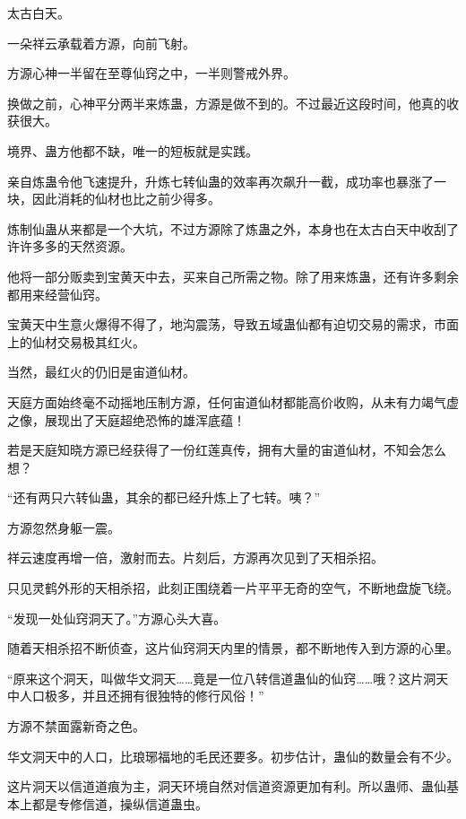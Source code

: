 
\begin{this_body}



太古白天。

一朵祥云承载着方源，向前飞射。

方源心神一半留在至尊仙窍之中，一半则警戒外界。

换做之前，心神平分两半来炼蛊，方源是做不到的。不过最近这段时间，他真的收获很大。

境界、蛊方他都不缺，唯一的短板就是实践。

亲自炼蛊令他飞速提升，升炼七转仙蛊的效率再次飙升一截，成功率也暴涨了一块，因此消耗的仙材也比之前少得多。

炼制仙蛊从来都是一个大坑，不过方源除了炼蛊之外，本身也在太古白天中收刮了许许多多的天然资源。

他将一部分贩卖到宝黄天中去，买来自己所需之物。除了用来炼蛊，还有许多剩余都用来经营仙窍。

宝黄天中生意火爆得不得了，地沟震荡，导致五域蛊仙都有迫切交易的需求，市面上的仙材交易极其红火。

当然，最红火的仍旧是宙道仙材。

天庭方面始终毫不动摇地压制方源，任何宙道仙材都能高价收购，从未有力竭气虚之像，展现出了天庭超绝恐怖的雄浑底蕴！

若是天庭知晓方源已经获得了一份红莲真传，拥有大量的宙道仙材，不知会怎么想？

“还有两只六转仙蛊，其余的都已经升炼上了七转。咦？”

方源忽然身躯一震。

祥云速度再增一倍，激射而去。片刻后，方源再次见到了天相杀招。

只见灵鹤外形的天相杀招，此刻正围绕着一片平平无奇的空气，不断地盘旋飞绕。

“发现一处仙窍洞天了。”方源心头大喜。

随着天相杀招不断侦查，这片仙窍洞天内里的情景，都不断地传入到方源的心里。

“原来这个洞天，叫做华文洞天……竟是一位八转信道蛊仙的仙窍……哦？这片洞天中人口极多，并且还拥有很独特的修行风俗！”

方源不禁面露新奇之色。

华文洞天中的人口，比琅琊福地的毛民还要多。初步估计，蛊仙的数量会有不少。

这片洞天以信道道痕为主，洞天环境自然对信道资源更加有利。所以蛊师、蛊仙基本上都是专修信道，操纵信道蛊虫。


\end{this_body}
